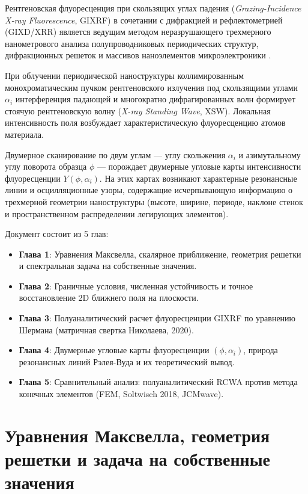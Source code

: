 \documentclass[a4paper,11pt]{article}
\begin{document}
Рентгеновская флуоресценция при скользящих углах падения (\textit{Grazing-Incidence X-ray Fluorescence}, GIXRF) в сочетании с дифракцией и рефлектометрией (GIXD/XRR) является ведущим методом неразрушающего трехмерного нанометрового анализа полупроводниковых периодических структур, дифракционных решеток и массивов наноэлементов микроэлектроники \cite{soltwisch2018, nikolaev2020, dialameh2018}.

При облучении периодической наноструктуры коллимированным монохроматическим пучком рентгеновского излучения под скользящими углами $\alpha_i$ интерференция падающей и многократно дифрагированных волн формирует стоячую рентгеновскую волну (\textit{X-ray Standing Wave}, XSW). Локальная интенсивность поля возбуждает характеристическую флуоресценцию атомов материала.

Двумерное сканирование по двум углам — углу скольжения $\alpha_i$ и азимутальному углу поворота образца $\phi$ — порождает двумерные угловые карты интенсивности флуоресценции $Y(\phi, \alpha_i)$. На этих картах возникают характерные резонансные линии и осцилляционные узоры, содержащие исчерпывающую информацию о трехмерной геометрии наноструктуры (высоте, ширине, периоде, наклоне стенок и пространственном распределении легирующих элементов).

Документ состоит из 5 глав:
\begin{itemize}
    \item \textbf{Глава 1}: Уравнения Максвелла, скалярное приближение, геометрия решетки и спектральная задача на собственные значения.
    \item \textbf{Глава 2}: Граничные условия, численная устойчивость и точное восстановление 2D ближнего поля на плоскости.
    \item \textbf{Глава 3}: Полуаналитический расчет флуоресценции GIXRF по уравнению Шермана (матричная свертка Николаева, 2020).
    \item \textbf{Глава 4}: Двумерные угловые карты флуоресценции $(\phi, \alpha_i)$, природа резонансных линий Рэлея-Вуда и их теоретический вывод.
    \item \textbf{Глава 5}: Сравнительный анализ: полуаналитический RCWA против метода конечных элементов (FEM, Soltwisch 2018, JCMwave).
\end{itemize}

\newpage
\section{Уравнения Максвелла, геометрия решетки и задача на собственные значения}
\end{document}
